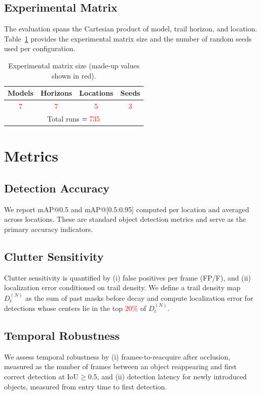 \documentclass[twocolumn, 10pt]{article}
\newcommand{\ph}[1]{\textcolor{red}{#1}}
\begin{document}
\subsection{Experimental Matrix}
The evaluation spans the Cartesian product of model, trail horizon, and location. Table~\ref{tab:matrix} provides the experimental matrix size and the number of random seeds used per configuration.

\begin{table}[t]
\centering
\caption{Experimental matrix size (made-up values shown in red).}
\label{tab:matrix}
\begin{tabular}{@{}cccc@{}}
\toprule
\textbf{Models} & \textbf{Horizons} & \textbf{Locations} & \textbf{Seeds} \\
\midrule
\ph{7} & \ph{7} & \ph{5} & \ph{3} \\
\midrule
\multicolumn{4}{c}{Total runs $= \ph{735}$} \\
\bottomrule
\end{tabular}
\end{table}

\section{Metrics}
\subsection{Detection Accuracy}
We report mAP@0.5 and mAP@[0.5:0.95] computed per location and averaged across locations. These are standard object detection metrics and serve as the primary accuracy indicators.

\subsection{Clutter Sensitivity}
Clutter sensitivity is quantified by (i) false positives per frame (FP/F), and (ii) localization error conditioned on trail density. We define a trail density map $D_t^{(N)}$ as the sum of past masks before decay and compute localization error for detections whose centers lie in the top \ph{20\%} of $D_t^{(N)}$.

\subsection{Temporal Robustness}
We assess temporal robustness by (i) frames-to-reacquire after occlusion, measured as the number of frames between an object reappearing and first correct detection at IoU$\geq$0.5, and (ii) detection latency for newly introduced objects, measured from entry time to first detection.
\end{document}
